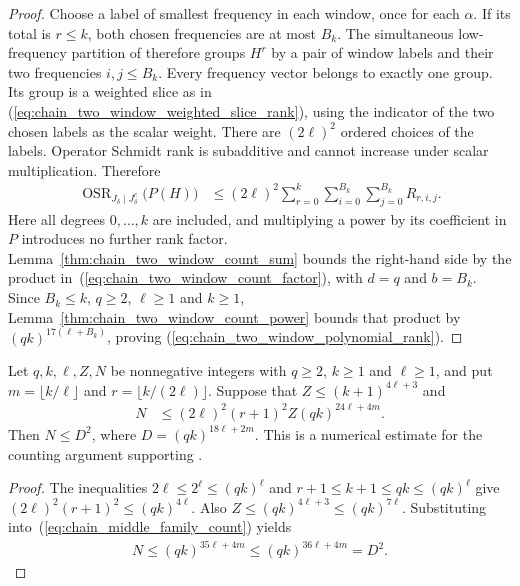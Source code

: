 \begin{proof}
    Choose a label of smallest frequency in each window, once for each
    $\alpha$. If its total is $r\le k$, both chosen frequencies are at
    most $B_k$. The simultaneous low-frequency partition of
    \cite{QICLean2026Blueprint} therefore groups $H^r$ by a pair of
    window labels and their two frequencies $i,j\le B_k$.
    Every frequency vector belongs to exactly one group.
    Its group is a weighted slice as in
    (\ref{eq:chain_two_window_weighted_slice_rank}), using the indicator
    of the two chosen labels as the scalar weight.
    There are $(2\ell)^2$ ordered choices of the labels.
    Operator Schmidt rank is subadditive and cannot increase under scalar
    multiplication. Therefore
    \begin{align}
        \operatorname{OSR}_{J_\delta\mid J_\delta^c}\bigl(P(H)\bigr)
         & \le(2\ell)^2\sum_{r=0}^{k}
        \sum_{i=0}^{B_k}\sum_{j=0}^{B_k}R_{r,i,j}.
        \label{eq:chain_two_window_polynomial_degree_sum}
    \end{align}
    Here all degrees $0,\ldots,k$ are included, and multiplying a power
    by its coefficient in $P$ introduces no further rank factor.
    Lemma~\ref{thm:chain_two_window_count_sum} bounds the right-hand
    side by the product in~(\ref{eq:chain_two_window_count_factor}), with
    $d=q$ and $b=B_k$. Since $B_k\le k$, $q\ge2$, $\ell\ge1$ and $k\ge1$,
    Lemma~\ref{thm:chain_two_window_count_power} bounds that product by
    $(qk)^{17(\ell+B_k)}$, proving
    (\ref{eq:chain_two_window_polynomial_rank}).
\end{proof}






\begin{lemma}
    \label{thm:chain_two_window_family_cardinality}
    \leanok
    Let $q,k,\ell,Z,N$ be nonnegative integers with $q\ge2$, $k\ge1$ and
    $\ell\ge1$, and put $m=\lfloor k/\ell\rfloor$ and
    $r=\lfloor k/(2\ell)\rfloor$.
    Suppose that $Z\le(k+1)^{4\ell+3}$ and
    \begin{align}
        N & \le (2\ell)^2(r+1)^2 Z(qk)^{24\ell+4m}.\label{eq:chain_middle_family_count}
    \end{align}
    Then $N\le D^2$, where $D=(qk)^{18\ell+2m}$.
    This is a numerical estimate for the counting argument supporting
    \cite[Proposition~5.7]{Arad2016RigorousRG}.
\end{lemma}
\begin{proof}\leanok
    The inequalities $2\ell\le2^\ell\le(qk)^\ell$ and
    $r+1\le k+1\le qk\le(qk)^\ell$ give
    $(2\ell)^2(r+1)^2\le(qk)^{4\ell}$.
    Also $Z\le(qk)^{4\ell+3}\le(qk)^{7\ell}$.
    Substituting into~(\ref{eq:chain_middle_family_count}) yields
    \begin{align*}
        N\le(qk)^{35\ell+4m}\le(qk)^{36\ell+4m}=D^2.
    \end{align*}
\end{proof}

